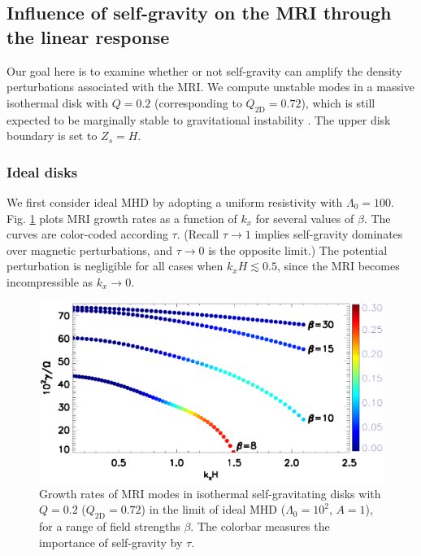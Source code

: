 \subsection{Influence of self-gravity on the MRI through the linear
  response}  
Our goal here is to examine whether or not self-gravity can amplify
the density perturbations associated with the MRI. We compute unstable modes
in a massive isothermal disk with $Q=0.2$ (corresponding to
$Q_\mathrm{2D}=0.72$), which is still expected to be marginally  
stable to gravitational instability \citep[][who find
a critical value of  $Q\simeq 0.2$]{mamat10}.   
The upper disk boundary is set to $Z_s=H$. 


\subsubsection{Ideal disks}
We first consider ideal MHD by adopting a uniform 
resistivity with $\Lambda_0=100$.  
Fig. \ref{gravity_energy} plots MRI growth rates as a function of
$k_x$ for several values of $\beta$. The curves are color-coded 
according $\tau$. (Recall $\tau\to1$ implies self-gravity dominates
over magnetic perturbations, and $\tau\to0$ is the opposite limit.)  
The potential perturbation is negligible for all cases when
$k_xH\lesssim 0.5$, since the MRI becomes incompressible as $k_x\to
0$.  

\begin{figure}
  \includegraphics[width=\linewidth]{figures/compare_energy_ideal}
  \caption{Growth rates of MRI modes in isothermal self-gravitating
    disks with $Q=0.2$ ($Q_\mathrm{2D}=0.72$) in the limit of ideal MHD
    ($\Lambda_0=10^2$, $A=1$), for a range of field strengths $\beta$. The
    colorbar measures the importance of self-gravity by $\tau$.  
    \label{gravity_energy}}
\end{figure}

